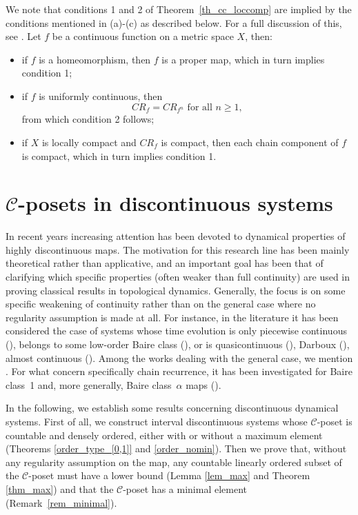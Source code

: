 \documentclass[pdflatex,sn-mathphys-num]{sn-jnl}
\theoremstyle{thmstyleone}%
\theoremstyle{thmstyletwo}%
\theoremstyle{thmstylethree}%
\begin{document}
\noindent We note that conditions 1 and 2 of Theorem~\ref{th_cc_loccomp} are implied by the conditions mentioned in (a)-(c) as described below. For a full discussion of this, see \cite[Theorem 4.0]{hu91}.
Let $f$ be a continuous function on a metric space $X$, then:
\begin{itemize}
\item[(a)] if $f$ is a homeomorphism, then $f$ is a proper map, which in turn implies condition 1;
\item[(b)] if $f$ is uniformly continuous, then
\[
CR_f=CR_{f^n} \text{ for all $n\geq 1$},
\]
from which condition 2 follows;
\item[(c)] if $X$ is locally compact and $CR_f$ is compact, then each chain component of $f$ is compact, which in turn implies condition 1.
\end{itemize}

\section{$\mathcal{C}$-posets in discontinuous systems}

In recent years increasing attention has been devoted to dynamical properties of highly discontinuous maps. The motivation for this research line has been mainly theoretical rather than applicative, and an important goal has been that of clarifying which specific properties (often weaker than full continuity) are used in proving classical results in topological dynamics. Generally, the focus is on some specific weakening of continuity rather than on the general case where no regularity assumption is made at all.
For instance, in the literature it has been considered the case of systems whose time evolution is only piecewise continuous (\cite{llibre2015birth,llibre2015maximum}), belongs to some low-order Baire class (\cite{steele17, steele18, steele19, steelebaire2}), or is quasicontinuous (\cite{crannellmartelli,crannel05}), Darboux (\cite{pawlakdarboux,pawentropy}), almost continuous (\cite{pawlak19,szuca10}). 
Among the works dealing with the general case, we mention \cite{ciklova}. 
For what concern specifically chain recurrence, it has been investigated for Baire class~1 and, more generally, Baire class~$\alpha$ maps (\cite{alikhani2019chain,alikhani2022iterates}).

\noindent In the following, we establish some results concerning discontinuous dynamical systems. First of all, we construct interval discontinuous systems whose $\mathcal{C}$-poset is countable and densely ordered, either with or without a maximum element (Theorems \ref{order_type_[0,1]} and \ref{order_nomin}). Then we prove that, without any regularity assumption on the map, any countable linearly ordered subset of the $\mathcal{C}$-poset must have a lower bound (Lemma \ref{lem_max} and Theorem \ref{thm_max}) and that the $\mathcal{C}$-poset has a minimal element (Remark~\ref{rem_minimal}).
\end{document}
